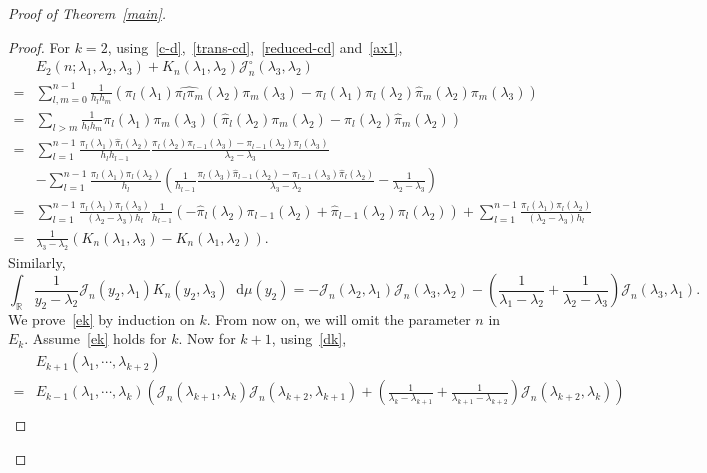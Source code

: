 \documentclass[a4paper]{article}
\theoremstyle{plain}
\theoremstyle{definition}
\newcommand{\dif}{\mathop{}\!\mathrm{d}}
\newcommand{\RR}{\mathbb{R}}
\newcommand{\nn}{\nonumber}
\begin{document}
\begin{proof}[Proof of Theorem~\ref{main}]
\begin{proof}
	For $k=2$, using~\eqref{c-d},~\eqref{trans-cd},~\eqref{reduced-cd} and~\eqref{ax1},
	\begin{align}
		&E_2(n;\lambda_1,\lambda_2,\lambda_3)+K_n(\lambda_1,\lambda_2)\mathcal J_n^\circ(\lambda_3,\lambda_2)\nn\\
		=&\sum_{l,m=0}^{n-1}\frac{1}{h_lh_m}(\pi_l(\lambda_1)\widehat{\pi_l\pi_m}(\lambda_2)\pi_m(\lambda_3)-\pi_l(\lambda_1)\pi_l(\lambda_2)\widehat\pi_m(\lambda_2)\pi_m(\lambda_3))\nn\\
		=&\sum_{l>m}\frac{1}{h_lh_m}\pi_l(\lambda_1)\pi_m(\lambda_3)(\widehat\pi_l(\lambda_2)\pi_m(\lambda_2)-\pi_l(\lambda_2)\widehat\pi_m(\lambda_2))\nn\\
		=&\sum_{l=1}^{n-1}\frac{\pi_l(\lambda_1)\widehat\pi_l(\lambda_2)}{h_lh_{l-1}}\frac{\pi_l(\lambda_2)\pi_{l-1}(\lambda_3)-\pi_{l-1}(\lambda_2)\pi_l(\lambda_3)}{\lambda_2-\lambda_3}\nn\\
		&-\sum_{l=1}^{n-1}\frac{\pi_l(\lambda_1)\pi_l(\lambda_2)}{h_l}\left(\frac{1}{h_{l-1}}\frac{\pi_l(\lambda_3)\widehat\pi_{l-1}(\lambda_2)-\pi_{l-1}(\lambda_3)\widehat\pi_l(\lambda_2)}{\lambda_3-\lambda_2} -\frac{1}{\lambda_2-\lambda_3}\right) \nn\\
		=&\sum_{l=1}^{n-1}\frac{\pi_l(\lambda_1)\pi_l(\lambda_3)}{(\lambda_2-\lambda_3)h_l}\frac{1}{h_{l-1}}(-\widehat\pi_l(\lambda_2)\pi_{l-1}(\lambda_2)+\widehat\pi_{l-1}(\lambda_2)\pi_l(\lambda_2))+\sum_{l=1}^{n-1}\frac{\pi_l(\lambda_1)\pi_l(\lambda_2)}{(\lambda_2-\lambda_3)h_l} \nn\\
		=&\frac{1}{\lambda_3-\lambda_2}(K_n(\lambda_1,\lambda_3)-K_n(\lambda_1,\lambda_2)). \label{method}
	\end{align} 
	Similarly,
	\begin{equation} \label{dk}
		\int_\RR\frac{1}{y_2-\lambda_2}\mathcal J_n(y_2,\lambda_1)K_n(y_2,\lambda_3)\dif\mu(y_2)=-\mathcal J_n(\lambda_2,\lambda_1)\mathcal J_n(\lambda_3,\lambda_2)-\left(\frac{1}{\lambda_1-\lambda_2}+\frac{1}{\lambda_2-\lambda_3}\right)\mathcal J_n(\lambda_3,\lambda_1).
	\end{equation}
	We prove~\eqref{ek} by induction on $k$. From now on, we will omit the parameter $n$ in $E_k$. Assume~\eqref{ek} holds for $k$. Now for $k+1$, using~\eqref{dk},
	\begin{align}
		&E_{k+1}(\lambda_1,\cdots,\lambda_{k+2})\nn\\
		=&E_{k-1}(\lambda_1,\cdots,\lambda_k)\left(\mathcal J_n(\lambda_{k+1},\lambda_k)\mathcal J_n(\lambda_{k+2},\lambda_{k+1})+\left(\frac{1}{\lambda_k-\lambda_{k+1}}+\frac{1}{\lambda_{k+1}-\lambda_{k+2}}\right)\mathcal J_n(\lambda_{k+2},\lambda_k)\right)\nn\\

\end{align}
\end{proof}
\end{proof}
\end{document}
